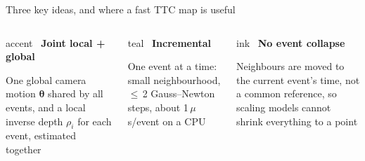 \documentclass[aspectratio=169,10pt]{beamer}
\newcommand{\us}{\,$\mu$s}
\begin{document}
\begin{frame}{Three key ideas, and where a fast TTC map is useful}
  \begin{columns}[T,onlytextwidth]
    \begin{card}[equal height group=ideas,fontupper=\footnotesize\raggedright]{accent}
      {\faProjectDiagram}\ \textbf{Joint local + global}\par\smallskip
      One \alert{global camera motion} $\bm\theta$ shared by all events, and a
      \alert{local inverse depth} $\rho_i$ for each event, estimated together
    \end{card}
    \begin{card}[equal height group=ideas,fontupper=\footnotesize\raggedright]{teal}
      {\faBolt}\ \textbf{Incremental}\par\smallskip
      One event at a time: small neighbourhood, $\le$\,2 Gauss--Newton steps,
      about \alert{1\us/event} on a CPU
    \end{card}
    \begin{card}[equal height group=ideas,fontupper=\footnotesize\raggedright]{ink}
      {}\ \textbf{No event collapse}\par\smallskip
      Neighbours are moved to the \alert{current event's time}, not a common reference,
      so scaling models cannot shrink everything to a point
    \end{card}
  \end{columns}


\end{frame}
\end{document}
